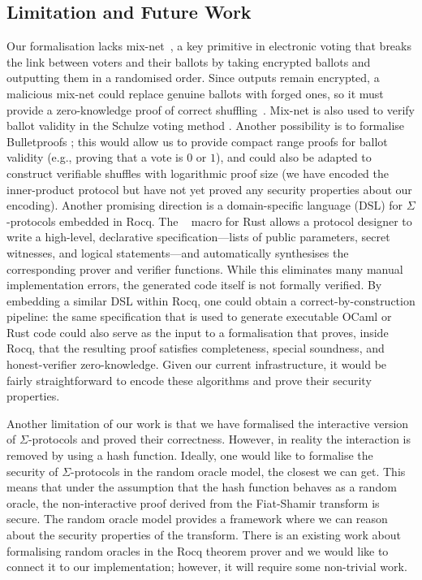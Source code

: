 \documentclass[sigconf,anonymous,review]{acmart}
\begin{document}
\subsection{Limitation and Future Work}
Our formalisation lacks mix-net~\cite{10.1145/358549.358563}, a key primitive in electronic voting that breaks the link between voters and their ballots by taking encrypted ballots and outputting them in a randomised order. Since outputs remain encrypted, a malicious mix-net could replace genuine ballots with forged ones, so it must provide a zero-knowledge proof of correct shuffling~\cite{10.1007/978-3-642-02620-1_28,10.1007/978-3-642-29011-4_17}. Mix-net is also used to verify ballot validity in the Schulze voting method \cite{haines2019verifiable}. Another possibility is to formalise Bulletproofs \cite{bunz2018bulletproofs}; this would allow us to provide compact range proofs for ballot validity (e.g., proving that a vote is $0$ or $1$), and could also be adapted to construct verifiable shuffles with logarithmic proof size (we have encoded the inner-product protocol but have not yet proved any security properties about our encoding). Another promising direction is a domain-specific language (DSL) for $\Sigma$-protocols embedded in Rocq. The \texttt{}~\cite{sigma-compiler,cryptoeprint:2026/794} macro for Rust allows a protocol designer to write a high-level, declarative specification---lists of public parameters, secret witnesses, and logical statements---and automatically synthesises the corresponding prover and verifier functions. While this eliminates many manual implementation errors, the generated code itself is not formally verified. By embedding a similar DSL within Rocq, one could obtain a correct-by-construction pipeline: the same specification that is used to generate executable OCaml or Rust code could also serve as the input to a formalisation that proves, inside Rocq, that the resulting proof satisfies completeness, special soundness, and honest-verifier zero-knowledge. Given our current infrastructure, it would be fairly straightforward to  encode these algorithms and prove their security properties. 
   

   Another limitation of our work is 
   that we have formalised the interactive version 
   of $\Sigma$-protocols and proved their correctness. However, 
   in reality the interaction is removed by 
   using a hash function. Ideally, one would like 
   to formalise the security of $\Sigma$-protocols in the random oracle 
   model, the closest we can get. This means that under the assumption 
   that the hash function behaves as a random oracle, the non-interactive 
   proof derived from the Fiat-Shamir transform \cite{10.5555/36664.36676} is secure. 
   The random oracle model provides a framework where we can 
   reason about the security properties  of 
   the transform. There is an existing 
   work about formalising random oracles in the Rocq theorem 
   prover \cite{10.1007/11617990_3} and we would like to
   connect it to our implementation; however, it
   will require some non-trivial work.
\end{document}
